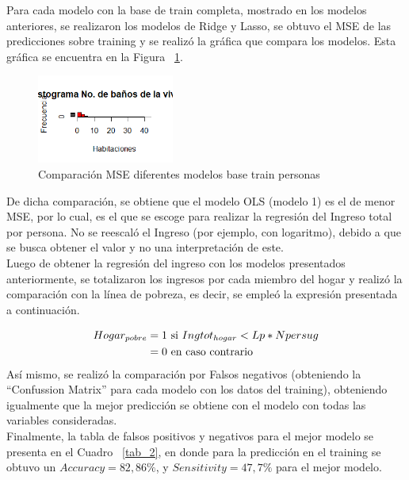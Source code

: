 \documentclass[conference, 10pt]{IEEEtran}
\begin{document}
Para cada modelo con la base de train completa, mostrado en los modelos anteriores, se realizaron los modelos de Ridge y Lasso, se obtuvo el MSE de las predicciones sobre training y se realizó la gráfica que compara los modelos. Esta gráfica se encuentra en la Figura ~\ref{fig1}.  

\begin{figure}[htbp]
\centerline{\includegraphics[width=0.4\textwidth]{../Vistas/Histograma_Banos.png}}
\caption{Comparación MSE diferentes modelos base train personas}
\label{fig1}
\end{figure}

De dicha comparación, se obtiene que el modelo OLS (modelo 1) es el de menor MSE, por lo cual, es el que se escoge para realizar la regresión del Ingreso total por persona. No se reescaló el Ingreso (por ejemplo, con logaritmo), debido a que se busca obtener el valor y no una interpretación de este.\\
Luego de obtener la regresión del ingreso con los modelos presentados anteriormente, se totalizaron los ingresos por cada miembro del hogar y realizó la comparación con la línea de pobreza, es decir, se empleó la expresión presentada a continuación.  

\begin{align}
Hogar_{pobre}&=1 \textnormal{ si } Ingtot_{hogar}<Lp*Npersug\\
       &=0 \textnormal{ en caso contrario}
\end{align}
Así mismo, se realizó la comparación por Falsos negativos (obteniendo la ``Confussion Matrix'' para cada modelo con los datos del training), obteniendo igualmente que la mejor predicción se obtiene con el modelo con todas las variables consideradas.\\

Finalmente, la tabla de falsos positivos y negativos para el mejor modelo se presenta en el Cuadro ~\ref{tab_2}, en donde para la predicción en el training se obtuvo un $Accuracy=82,86\%$, y $Sensitivity=47,7\%$ para el mejor modelo.
\end{document}
